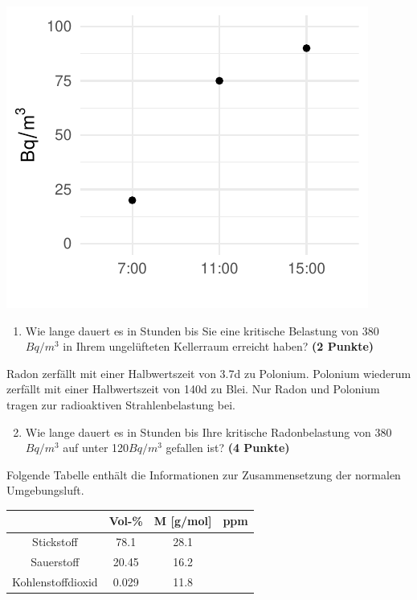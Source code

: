 \documentclass[a4paper, 9pt]{scrartcl}\usepackage[]{graphicx}\usepackage[]{xcolor}
\makeatletter
\def\maxwidth{ %
  \ifdim\Gin@nat@width>\linewidth
    \linewidth
  \else
    \Gin@nat@width
  \fi
}
\newenvironment{knitrout}{}{} %
\makeatother
\begin{document}
\begin{knitrout}
\color{fgcolor}

{\centering \includegraphics[width=\maxwidth]{img/math-10-1} 

}


\end{knitrout}

\vspace{-0.75cm}

\begin{enumerate}
\item Wie lange dauert es in Stunden bis Sie eine kritische Belastung von 380$Bq/m^3$ in Ihrem ungelüfteten Kellerraum erreicht haben? \textbf{(2 Punkte)}
\end{enumerate}

Radon zerfällt mit einer Halbwertszeit von 3.7d zu Polonium. Polonium wiederum zerfällt mit einer Halbwertszeit von 140d zu Blei. Nur Radon und Polonium tragen zur radioaktiven Strahlenbelastung bei.

\begin{enumerate}
  \setcounter{enumi}{1}
\item Wie lange dauert es in Stunden bis Ihre kritische Radonbelastung von
  380$Bq/m^3$ auf unter 120$Bq/m^3$ gefallen ist?
  \textbf{(4 Punkte)}
\end{enumerate}

Folgende Tabelle enthält die Informationen zur Zusammensetzung der normalen Umgebungsluft.

\begin{center}
  \begin{tabular}{ c|c|c|c }
     & Vol-\% & M [g/mol] & ppm \\
    \hline
    Stickstoff & 78.1 & 28.1 &
                                                    \phantom{1000000000000}\strut\\
        \hline
    Sauerstoff & 20.45 & 16.2 &
                                                    \phantom{10000000}\strut\\
        \hline
    Kohlenstoffdioxid & 0.029 & 11.8 & \phantom{10000000}\strut\\     
     \hline
\end{tabular}
\end{center}
\end{document}
